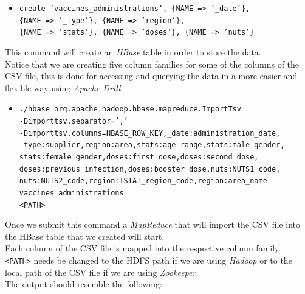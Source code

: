 \documentclass[12pt, a4paper]{article}
\begin{document}
\begin{footnotesize}
  \begin{itemize}
    \item[] \texttt{create 'vaccines\_administrations', \{NAME => '\_date'\}, \\
      \{NAME => '\_type'\}, \{NAME => 'region'\}, \\
      \{NAME => 'stats'\}, \{NAME => 'doses'\}, \{NAME => 'nuts'\}} 
  \end{itemize}
\end{footnotesize}
This command will create an \emph{HBase} table in order to store the data. \\
Notice that we are creating five column families for some of the columns of the CSV file,
this is done for accessing and querying the data in a more easier and flexible way using
\emph{Apache Drill}. 

\vfill %

\begin{footnotesize}
  \begin{itemize}
    \item[] \texttt{./hbase org.apache.hadoop.hbase.mapreduce.ImportTsv \\
      -Dimporttsv.separator=',' \\
      -Dimporttsv.columns=HBASE\_ROW\_KEY,\_date:administration\_date, \\
        \_type:supplier,region:area,stats:age\_range,stats:male\_gender, \\
        stats:female\_gender,doses:first\_dose,doses:second\_dose, \\
        doses:previous\_infection,doses:booster\_dose,nuts:NUTS1\_code, \\
        nuts:NUTS2\_code,region:ISTAT\_region\_code,region:area\_name \\
      vaccines\_administrations \\
      <PATH>} 
  \end{itemize}
\end{footnotesize}
Once we submit this command a \emph{MapReduce} that will import the CSV file into the 
HBase table that we created will start. \\
Each column of the CSV file is mapped into the respective column family.  \\
\texttt{<PATH>} needs be changed to the HDFS path if we are using \emph{Hadoop} or to 
the local path of the CSV file if we are using \emph{Zookeeper}. \\
The output should resemble the following: 
\end{document}
